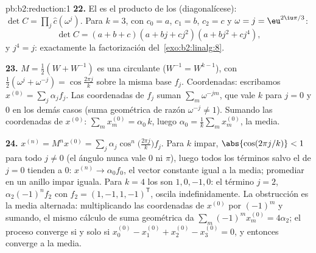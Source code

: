 \begin{solution}{pb:b2:reduction:1}
\textbf{22.} El  es el producto de los 
(diagonalícese): $\det C = \prod_{j}\widehat c(\omega^j)$. Para $k
= 3$, con $c_0 = a$, $c_1 = b$, $c_2 = c$ y $\omega = j =
\eu^{2\iu\pi/3}$:
\[
\det C = (a + b + c)(a + bj + cj^2)(a + bj^2 + cj^4),
\]
y $j^4 = j$: exactamente la factorización del~\cref{exo:b2:linalg:8}.

\textbf{23.} $M = \frac12(W + W^{-1})$ es una circulante ($W^{-1}
= W^{k-1}$), con  $\frac12(\omega^j + \omega^{-j})
= \cos\frac{2\pi j}k$ sobre la misma base $f_j$. Coordenadas:
escribamos $x^{(0)} = \sum_j \alpha_j f_j$. Las coordenadas de
$f_j$ suman $\sum_m \omega^{-jm}$, que vale $k$ para $j = 0$ y $0$
en los demás casos (suma geométrica de razón $\omega^{-j} \neq
1$). Sumando las coordenadas de $x^{(0)}$: $\sum_m x^{(0)}_m =
\alpha_0\,k$, luego $\alpha_0 = \frac1k\sum_m x^{(0)}_m$, la
media.

\textbf{24.} $x^{(n)} = M^nx^{(0)} = \sum_j
\alpha_j\cos^n\bigl(\tfrac{2\pi j}k\bigr)f_j$. Para $k$ impar,
$\abs{\cos(2\pi j/k)} < 1$ para todo $j \neq 0$ (el ángulo nunca
vale $0$ ni $\pi$), luego todos los términos salvo el de $j = 0$
tienden a $0$: $x^{(n)} \to \alpha_0 f_0$, el vector constante
igual a la media; promediar en un anillo impar iguala. Para $k =
4$ los  son $1, 0, -1, 0$: el término $j = 2$,
$\alpha_2(-1)^nf_2$ con $f_2 = (1, -1, 1, -1)^{\mathsf T}$, oscila
indefinidamente. La obstrucción es la media alternada:
multiplicando las coordenadas de $x^{(0)}$ por $(-1)^m$ y sumando,
el mismo cálculo de suma geométrica da $\sum_m (-1)^mx^{(0)}_m =
4\alpha_2$; el proceso converge si y solo si $x^{(0)}_0 -
x^{(0)}_1 + x^{(0)}_2 - x^{(0)}_3 = 0$, y entonces converge a la
media.


\end{solution}
